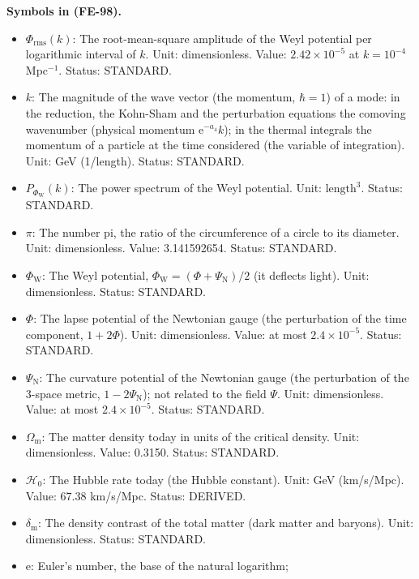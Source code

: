 \documentclass[
  10pt,
]{article}
\providecommand{\tightlist}{%
  \setlength{\itemsep}{0pt}\setlength{\parskip}{0pt}}
\begin{document}
\textbf{Symbols in (FE-98).}

\begin{itemize}
\tightlist
\item
  \(\Phi_{\mathrm{rms}}(k)\): The root-mean-square amplitude of the Weyl
  potential per logarithmic interval of \(k\). Unit: dimensionless.
  Value: \(2.42\times10^{-5}\) at \(k = 10^{-4}\) Mpc\(^{-1}\). Status:
  STANDARD.
\item
  \(k\): The magnitude of the wave vector (the momentum, \(\hbar = 1\))
  of a mode: in the reduction, the Kohn-Sham and the perturbation
  equations the comoving wavenumber (physical momentum
  \(\mathrm{e}^{-a_4}k\)); in the thermal integrals the momentum of a
  particle at the time considered (the variable of integration). Unit:
  GeV (1/length). Status: STANDARD.
\item
  \(P_{\Phi_{\mathrm{W}}}(k)\): The power spectrum of the Weyl
  potential. Unit: \(\mathrm{length}^{3}\). Status: STANDARD.
\item
  \(\pi\): The number pi, the ratio of the circumference of a circle to
  its diameter. Unit: dimensionless. Value: 3.141592654. Status:
  STANDARD.
\item
  \(\Phi_{\mathrm{W}}\): The Weyl potential,
  \(\Phi_{\mathrm{W}} = (\Phi + \Psi_{\mathrm{N}})/2\) (it deflects
  light). Unit: dimensionless. Status: STANDARD.
\item
  \(\Phi\): The lapse potential of the Newtonian gauge (the perturbation
  of the time component, \(1 + 2\Phi\)). Unit: dimensionless. Value: at
  most \(2.4\times10^{-5}\). Status: STANDARD.
\item
  \(\Psi_{\mathrm{N}}\): The curvature potential of the Newtonian gauge
  (the perturbation of the 3-space metric, \(1 - 2\Psi_{\mathrm{N}}\));
  not related to the field \(\Psi\). Unit: dimensionless. Value: at most
  \(2.4\times10^{-5}\). Status: STANDARD.
\item
  \(\Omega_{\mathrm{m}}\): The matter density today in units of the
  critical density. Unit: dimensionless. Value: 0.3150. Status:
  STANDARD.
\item
  \(\mathcal{H}_0\): The Hubble rate today (the Hubble constant). Unit:
  GeV (km/s/Mpc). Value: 67.38 km/s/Mpc. Status: DERIVED.
\item
  \(\delta_{\mathrm{m}}\): The density contrast of the total matter
  (dark matter and baryons). Unit: dimensionless. Status: STANDARD.
\item
  \(\mathrm{e}\): Euler's number, the base of the natural logarithm;

\end{itemize}
\end{document}

